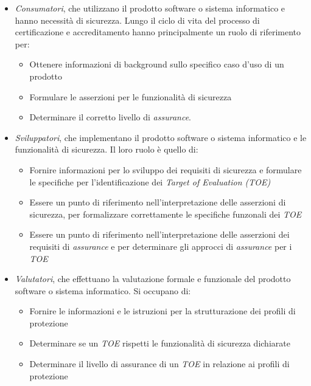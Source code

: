\documentclass[../main.tex]{subfiles}
\begin{document}
\begin{itemize}
\item \textit{Consumatori}, che utilizzano il prodotto software o sistema informatico e hanno necessità di sicurezza. Lungo il ciclo di vita del processo di certificazione e accreditamento hanno principalmente un ruolo di riferimento per:
\begin{itemize}
\item Ottenere informazioni di background sullo specifico caso d'uso di un prodotto
\item Formulare le asserzioni per le funzionalità di sicurezza
\item Determinare il corretto livello di \textit{assurance}.
\end{itemize}
\item \textit{Sviluppatori}, che implementano il prodotto software o sistema informatico e le funzionalità di sicurezza. Il loro ruolo è quello di:
\begin{itemize}
\item Fornire informazioni per lo sviluppo dei requisiti di sicurezza e formulare le specifiche per l'identificazione dei \textit{Target of Evaluation (TOE)}
\item Essere un punto di riferimento nell'interpretazione delle asserzioni di sicurezza, per formalizzare correttamente le specifiche funzonali dei \textit{TOE}
\item Essere un punto di riferimento nell'interpretazione delle asserzioni dei requisiti di \textit{assurance} e per determinare gli approcci di \textit{assurance} per i \textit{TOE}
\end{itemize}
\item \textit{Valutatori}, che effettuano la valutazione formale e funzionale del prodotto software o sistema informatico. Si occupano di:
\begin{itemize}
\item Fornire le informazioni e le istruzioni per la strutturazione dei profili di protezione
\item Determinare se un \textit{TOE} rispetti le funzionalità di sicurezza dichiarate
\item Determinare il livello di assurance di un \textit{TOE} in relazione ai profili di protezione
\end{itemize}
\end{itemize}
\end{document}
